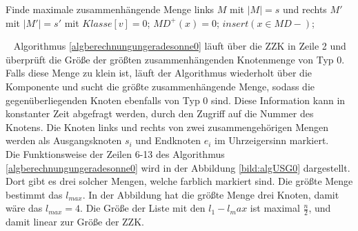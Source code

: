 \begin{algorithm}
\caption{$USG1(x)$}
\begin{algorithmic}[1]
\vspace{2mm} 
	\STATE Finde maximale zusammenhängende Menge links $M$ mit $|M|=s$ und rechts $M'$ mit $|M'|=s'$ mit 			$Klasse[v]=0$;
	\ENDIF
{} 
	\ENDIF 
{}  \STATE $MD^+(x)=0$;
									 	\STATE $insert(x \in MD-)$;\ENDIF
\vspace{2mm}
\end{algorithmic}
\label{algberechnunggeradesonne1}
\end{algorithm}
\vspace{-3mm}
~\linebreak
Algorithmus \ref{algberechnungungeradesonne0} läuft über die ZZK in Zeile 2 und überprüft die Größe der größten zusammenhängenden Knotenmenge von Typ $0$. Falls diese Menge zu klein ist, läuft der Algorithmus wiederholt über die Komponente und sucht die größte zusammenhängende Menge, sodass die gegenüberliegenden Knoten ebenfalls von Typ $0$ sind. Diese Information kann in konstanter Zeit abgefragt werden, durch den Zugriff auf die Nummer des Knotens. Die Knoten links und rechts von zwei zusammengehörigen Mengen werden als Ausgangsknoten $s_i$ und Endknoten $e_i$ im Uhrzeigersinn markiert.\\
Die Funktionsweise der Zeilen 6-13 des Algorithmus \ref{algberechnungungeradesonne0} wird in der Abbildung \ref{bild:algUSG0} dargestellt. Dort gibt es drei solcher Mengen, welche farblich markiert sind. Die größte Menge bestimmt das $l_{max}$. In der Abbildung hat die größte Menge drei Knoten, damit wäre das $l_{max}=4$. Die Größe der Liste mit den $l_1-l_max$ ist maximal $\frac{n}{2}$, und damit linear zur Größe der ZZK.
\newpage
